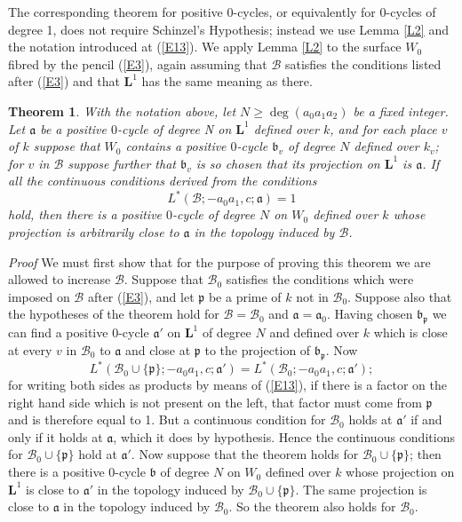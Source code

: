 \documentclass[12pt]{article}
\def\bL{{\mathbf L}}
\def\fa{{\mathfrak a}}
\def\fb{{\mathfrak b}}
\def\fp{{\mathfrak p}}
\def\sB{{\mathcal B}}
\def\beq{\begin{equation} \label}
\def\bth{\begin{theorem} \label}
\def\eth{\end{theorem}}
\newtheorem{theorem}{Theorem}
\begin{document}
The corresponding theorem for positive 0-cycles, or equivalently for
0-cycles of degree 1, does not require Schinzel's Hypothesis; instead we use
Lemma \ref{L2} and the notation introduced at (\ref{E13}).
We apply Lemma \ref{L2} to the surface $W_0$ fibred by the pencil (\ref{E3}),
again assuming that $\sB$ satisfies the conditions listed after (\ref{E3})
and that $\bL^1$ has the same meaning as there.
\bth{T3} With the notation above, let $N\geq\deg(a_0a_1a_2)$ be a fixed
integer. Let $\fa$ be a positive $0$-cycle of degree N on $\bL^1$
defined over $k$,
and for each place $v$ of $k$ suppose that $W_0$ contains a positive
$0$-cycle $\fb_v$ of degree $N$ defined over $k_v$; for $v$ in $\sB$ suppose
further that $\fb_v$ is so chosen that its
projection on $\bL^1$ is $\fa$. If all the continuous conditions derived from
the conditions
\beq{E17} L^*(\sB;-a_0a_1,c;\fa)=1 \end{equation}
hold, then there is a positive $0$-cycle of degree $N$ on $W_0$
defined over $k$ whose projection
is arbitrarily close to $\fa$ in the topology induced by $\sB$.
\eth
\emph{Proof} We must first show that for the purpose of proving this theorem
we are allowed to increase $\sB$. Suppose that $\sB_0$ satisfies the conditions
which were imposed on $\sB$ after (\ref{E3}), and let $\fp$ be a prime of $k$
not in $\sB_0$. Suppose also that the hypotheses of the theorem hold for
$\sB=\sB_0$ and $\fa=\fa_0$. Having chosen $\fb_\fp$ we can
find a positive 0-cycle $\fa'$ on $\bL^1$ of degree $N$ and defined over $k$
which is close at every $v$ in $\sB_0$ to $\fa$
and close at $\fp$ to the projection of
$\fb_\fp$. Now
\[ L^*(\sB_0\cup\{\fp\};-a_0a_1,c;\fa')=L^*(\sB_0;-a_0a_1,c;\fa'); \]
for writing both sides as products by means of (\ref{E13}), if there is a
factor on the right hand side which is not present on the
left, that factor must come from $\fp$ and is therefore equal to 1.
But a continuous condition for $\sB_0$ holds at $\fa'$ if and only if it
holds at $\fa$, which it does by hypothesis. Hence the continuous conditions
for $\sB_0\cup\{\fp\}$ hold at $\fa'$. Now suppose that the theorem
holds for $\sB_0\cup\{\fp\}$; then there
is a positive 0-cycle $\fb$ of degree $N$ on $W_0$ defined over $k$ whose
projection on $\bL^1$ is close to $\fa'$ in the topology induced by $\sB_0
\cup\{\fp\}$. The same projection is close to $\fa$ in the topology induced by $\sB_0$.
So the theorem also holds for $\sB_0$.
\end{document}

